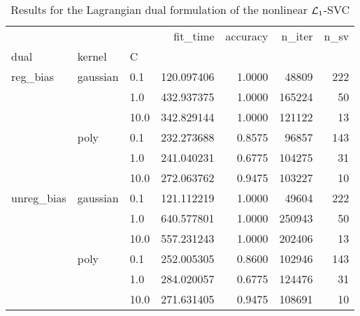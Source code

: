 \begin{table}[H]
\centering
\caption{Results for the Lagrangian dual formulation of the nonlinear $\protect \mathcal{L}_1$-SVC}
\label{nonlinear_lagrangian_dual_l1_svc_cv_results}
\begin{tabular}{lllrrrr}
\toprule
           &      &      &    fit\_time &  accuracy &  n\_iter &  n\_sv \\
dual & kernel & C &             &           &         &       \\
\midrule
reg\_bias & gaussian & 0.1  &  120.097406 &    1.0000 &   48809 &   222 \\
           &      & 1.0  &  432.937375 &    1.0000 &  165224 &    50 \\
           &      & 10.0 &  342.829144 &    1.0000 &  121122 &    13 \\
           & poly & 0.1  &  232.273688 &    0.8575 &   96857 &   143 \\
           &      & 1.0  &  241.040231 &    0.6775 &  104275 &    31 \\
           &      & 10.0 &  272.063762 &    0.9475 &  103227 &    10 \\
unreg\_bias & gaussian & 0.1  &  121.112219 &    1.0000 &   49604 &   222 \\
           &      & 1.0  &  640.577801 &    1.0000 &  250943 &    50 \\
           &      & 10.0 &  557.231243 &    1.0000 &  202406 &    13 \\
           & poly & 0.1  &  252.005305 &    0.8600 &  102946 &   143 \\
           &      & 1.0  &  284.020057 &    0.6775 &  124476 &    31 \\
           &      & 10.0 &  271.631405 &    0.9475 &  108691 &    10 \\
\bottomrule
\end{tabular}
\end{table}
